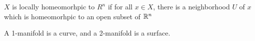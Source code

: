 $X$ is locally homeomorhpic to $R^n$ if for all $x \in X$, there is a neighborhood $U$ of $x$ which is homeomorhpic to an open subset of $\mathbb{R}^n$

A 1-manifold is a curve, and a 2-manifold is a surface.




